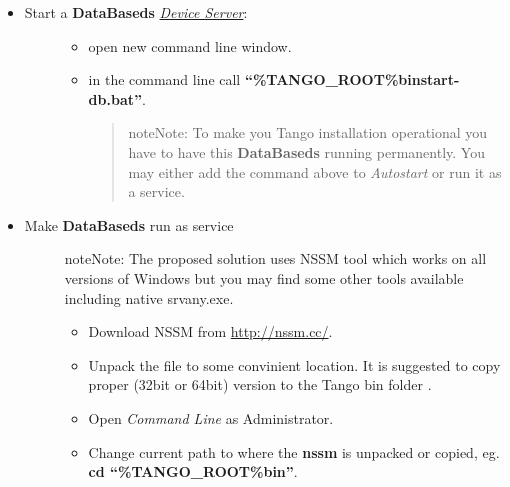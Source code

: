 \documentclass[letterpaper,10pt,english]{sphinxmanual}
\begin{document}
\begin{itemize}
\item {} \begin{description}
\item[{Start a \textbf{DataBaseds} {\hyperref[glossary:term-device-server]{\emph{Device Server}}}:}] \leavevmode\begin{itemize}
\item {} 
open new command line window.

\item {} 
in the command line call \textbf{``\%TANGO\_ROOT\%binstart-db.bat''}.
\begin{quote}

\begin{notice}{note}{Note:}
To make you Tango installation operational you have to have this \textbf{DataBaseds} running permanently.
You may either add the command above to \emph{Autostart} or run it as a service.
\end{notice}
\end{quote}

\end{itemize}

\end{description}

\item {} \begin{description}
\item[{Make \textbf{DataBaseds} run as service}] \leavevmode
\begin{notice}{note}{Note:}
The proposed solution uses NSSM tool which works on all versions of Windows but you may find some other tools
available including native srvany.exe.
\end{notice}
\begin{itemize}
\item {} 
Download NSSM from \href{http://nssm.cc/}{http://nssm.cc/}.

\item {} 
Unpack the file to some convinient location. It is suggested to copy proper (32bit or 64bit) version to the
Tango bin folder .

\item {} 
Open \emph{Command Line} as Administrator.

\item {} 
Change current path to where the \textbf{nssm} is unpacked or copied, eg. \textbf{cd ``\%TANGO\_ROOT\%bin''}.


\end{itemize}
\end{description}
\end{itemize}
\end{document}
